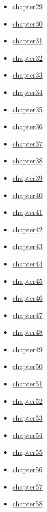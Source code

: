\documentclass[
]{article}
\begin{document}
\begin{itemize}
\begin{itemize}
  \item
    \href{benjamin13.2-5-51.md}{chapter29}
  \item
    \href{benjamin13.2-5-52.md}{chapter30}
  \item
    \href{benjamin13.2-5-53.md}{chapter31}
  \item
    \href{benjamin13.2-5-56.md}{chapter32}
  \item
    \href{benjamin13.2-5-62.md}{chapter33}
  \item
    \href{benjamin13.2-5-86.md}{chapter34}
  \item
    \href{benjamin13.2-5-88.md}{chapter35}
  \item
    \href{benjamin13.2-5-89.md}{chapter36}
  \item
    \href{benjamin13.2-5-97.md}{chapter37}
  \item
    \href{benjamin13.2-5-99.md}{chapter38}
  \item
    \href{benjamin13.2-5-100.md}{chapter39}
  \item
    \href{benjamin13.2-5-102.md}{chapter40}
  \item
    \href{benjamin13.2-5-103.md}{chapter41}
  \item
    \href{benjamin13.2-5-104.md}{chapter42}
  \item
    \href{benjamin13.2-5-107.md}{chapter43}
  \item
    \href{benjamin13.2-5-115.md}{chapter44}
  \item
    \href{benjamin13.2-5-117.md}{chapter45}
  \item
    \href{benjamin13.2-5-119.md}{chapter46}
  \item
    \href{benjamin13.2-5-122.md}{chapter47}
  \item
    \href{benjamin13.2-5-124.md}{chapter48}
  \item
    \href{benjamin13.2-5-125.md}{chapter49}
  \item
    \href{benjamin13.2-5-130.md}{chapter50}
  \item
    \href{benjamin13.2-5-131.md}{chapter51}
  \item
    \href{benjamin13.2-5-134.md}{chapter52}
  \item
    \href{benjamin13.2-5-135.md}{chapter53}
  \item
    \href{benjamin13.2-5-136.md}{chapter54}
  \item
    \href{benjamin13.2-5-138.md}{chapter55}
  \item
    \href{benjamin13.2-5-139.md}{chapter56}
  \item
    \href{benjamin13.2-5-141.md}{chapter57}
  \item
    \href{benjamin13.2-5-142.md}{chapter58}
  \end{itemize}
\end{itemize}
\end{document}
